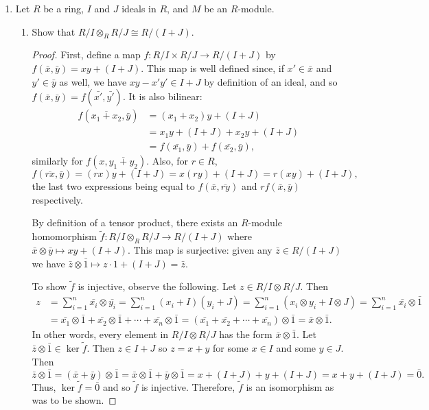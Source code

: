 \documentclass[11pt,oneside,english]{amsart}
\theoremstyle{definition}
\newcommand{\lspace}{\vspace{5mm}}
\begin{document}
\rightline{\today}

\lspace




\begin{enumerate}[leftmargin=*]
\itemsep5mm

\item Let $R$ be a ring, $I$ and $J$ ideals in $R$, and $M$ be an $R$-module.
\begin{enumerate}
\item Show that $R/I \otimes_R R/J \cong R/(I+J)$.

\begin{proof}
First, define a map $f:R/I\times R/J\to R/(I+J)$ by $f(\bar x, \bar y)=xy+(I+J)$. This map is well defined since, if $x'\in\bar x$ and $y'\in \bar y$ as well, we have $xy-x'y'\in I+J$ by definition of an ideal, and so $f(\bar x,\bar y)=f(\bar{x'}, \bar{y'})$. It is also bilinear:
\begin{align*}
f(\overline{x_1+x_2},\bar y)&=(x_1+x_2)y+(I+J)\\[2mm]
&=x_1y+(I+J)+x_2y+(I+J)\\[2mm]
&=f(\bar{x_1},\bar y)+f(\bar{x_2},\bar y),
\end{align*}
similarly for $f(x,\overline{y_1+y_2})$. Also, for $r\in R$,
\[
f(\overline{rx},\bar y)=(rx)y+(I+J)=x(ry)+(I+J)=r(xy)+(I+J),
\]
the last two expressions being equal to $f(\bar x,\overline{ry})$ and $rf(\bar x,\bar y)$ respectively.

By definition of a tensor product, there exists an $R$-module homomorphism $\tilde f:R/I \otimes_R R/J\to R/(I+J)$ where $\bar x\otimes \bar y\mapsto xy+(I+J)$. This map is surjective: given any $\bar z\in R/(I+J)$ we have $\bar z\otimes \bar 1\mapsto z\cdot1+(I+J)=\bar z$.

To show $\tilde f$ is injective, observe the following. Let $z\in R/I\otimes R/J$. Then
\begin{align*}
z&=\sum_{i=1}^n\bar{x_i}\otimes \bar{y_i}=\sum_{i=1}^n(x_i+I)(y_i+J)=\sum_{i=1}^n\left(x_i\otimes y_i+I\otimes J\right)=\sum_{i=1}^n \bar{x_i}\otimes \bar 1\\[2mm]
&=\bar{x_1}\otimes \bar 1+\bar{x_2}\otimes \bar 1+\cdots +\bar{x_n}\otimes \bar 1=(\bar{x_1}+\bar{x_2}+\cdots+\bar{x_n})\otimes\bar 1=\bar x\otimes \bar 1.
\end{align*}
In other words, every element in $R/I\otimes R/J$ has the form $\bar x\otimes \bar 1$. Let $\bar z \otimes \bar 1\in \ker \tilde f$. Then $z\in I+J$ so $z=x+y$ for some $x\in I$ and some $y\in J$. Then
\[
\bar z\otimes \bar 1=(\bar x+\bar y)\otimes \bar 1=\bar x\otimes \bar 1+\bar y\otimes\bar 1=x+(I+J)+y+(I+J)=x+y+(I+J)=\bar 0.
\]
Thus, $\ker \tilde f=\bar 0$ and so $\tilde f$ is injective. Therefore, $\tilde f$ is an isomorphism as was to be shown.
\end{proof}


\end{enumerate}
\end{enumerate}
\end{document}
